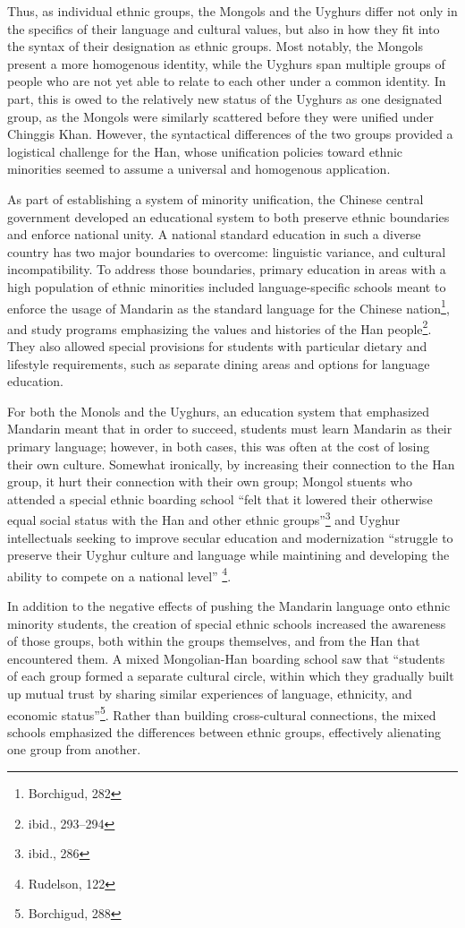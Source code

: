 Thus, as individual ethnic groups, the Mongols and the Uyghurs differ not only
in the specifics of their language and cultural values, but also in how they fit
into the syntax of their designation as ethnic groups. Most notably, the Mongols
present a more homogenous identity, while the Uyghurs span multiple groups of
people who are not yet able to relate to each other under a common identity. In
part, this is owed to the relatively new status of the Uyghurs as one designated
group, as the Mongols were similarly scattered before they were unified under
Chinggis Khan. However, the syntactical differences of the two groups provided a
logistical challenge for the Han, whose unification policies toward ethnic
minorities seemed to assume a universal and homogenous application.

\hrulefill

As part of establishing a system of minority unification, the Chinese central
government developed an educational system to both preserve ethnic boundaries
and enforce national unity. A national standard education in such a diverse
country has two major boundaries to overcome: linguistic variance, and cultural
incompatibility. To address those boundaries, primary education in areas with a
high population of ethnic minorities included language-specific schools meant to
enforce the usage of Mandarin as the standard language for the Chinese
nation\footnote{Borchigud, 282}, and study programs emphasizing the values and
histories of the Han people\footnote{ibid., 293--294}. They also allowed special
provisions for students with particular dietary and lifestyle requirements, such
as separate dining areas and options for language education.

For both the Monols and the Uyghurs, an education system that emphasized
Mandarin meant that in order to succeed, students must learn Mandarin as their
primary language; however, in both cases, this was often at the cost of losing
their own culture. Somewhat ironically, by increasing their connection to the
Han group, it hurt their connection with their own group; Mongol stuents who
attended a special ethnic boarding school ``felt that it lowered their otherwise
equal social status with the Han and other ethnic groups''\footnote{ibid., 286}
and Uyghur intellectuals seeking to improve secular education and modernization
``struggle to preserve their Uyghur culture and language while maintining and
developing the ability to compete on a national level'' \footnote{Rudelson,
122}.

In addition to the negative effects of pushing the Mandarin language onto ethnic
minority students, the creation of special ethnic schools increased the
awareness of those groups, both within the groups themselves, and from the Han
that encountered them. A mixed Mongolian-Han boarding school saw that ``students
of each group formed a separate cultural circle, within which they
gradually built up mutual trust by sharing similar experiences of language,
ethnicity, and economic status''\footnote{Borchigud, 288}. Rather than building
cross-cultural connections, the mixed schools emphasized the differences between
ethnic groups, effectively alienating one group from another.

